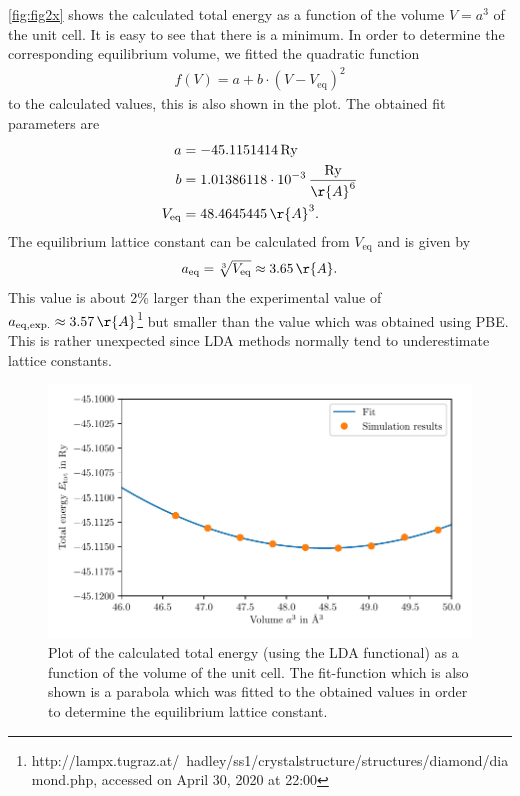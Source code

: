 \documentclass[a4paper,10pt,bibtotoc]{scrartcl}
\begin{document}
\autoref{fig:fig2x} shows the calculated total energy as a function of the volume $V=a^3$ of the unit cell. It is easy to see that there is a minimum. In order to determine the corresponding equilibrium volume, we fitted the quadratic function
\begin{align}
f(V) = a + b\cdot\left(V-V_\mathrm{eq}\right)^2
\end{align}
to the calculated values, this is also shown in the plot. The obtained fit parameters are
\begin{align}
a &= -45.1151414\,\mathrm{Ry}\\
b &= 1.01386118\cdot 10^{-3}\,\frac{\mathrm{Ry}}{\r{A}^6}\\
V_\mathrm{eq} &= 48.4645445\,\r{A}^3.
\end{align}
The equilibrium lattice constant can be calculated from $V_\mathrm{eq}$ and is given by
\begin{align}
a_\mathrm{eq} = \sqrt[3]{V_\mathrm{eq}} \approx 3.65\,\r{A}.
\end{align}
This value is about 2\% larger than the experimental value of $a_\mathrm{eq,exp.} \approx 3.57\,\r{A}$\footnote{http://lampx.tugraz.at/~hadley/ss1/crystalstructure/structures/diamond/diamond.php, accessed on April 30, 2020 at 22:00} but smaller than the value which was obtained using PBE. This is rather unexpected since LDA methods normally tend to underestimate lattice constants.

\begin{figure}[h]
\centering
 \includegraphics[width=\textwidth]{Figure_lattice_constant_LDA.pdf}
 \caption{Plot of the calculated total energy (using the LDA functional) as a function of the volume of the unit cell. The fit-function which is also shown is a parabola which was fitted to the obtained values in order to determine the equilibrium lattice constant.}
 \label{fig:fig2x}
\end{figure}
\end{document}
